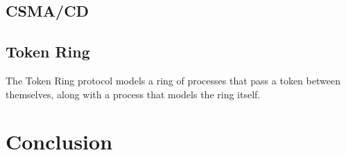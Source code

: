 \documentclass[a4paper,12pt]{article}
\begin{document}
\subsection{CSMA/CD}\label{evaluation-csma}
\subsection{Token Ring}\label{evaluation-token}

The Token Ring protocol models a ring of processes that pass a token between
themselves, along with a process that models the ring itself.

\section{Conclusion}\label{conclusion}

\newpage



\end{document}
